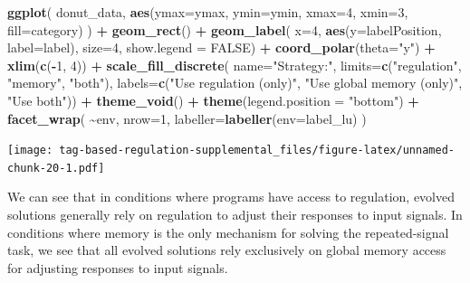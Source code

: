 \documentclass[
]{book}
\newenvironment{Shaded}{\begin{snugshade}}{\end{snugshade}}
\newcommand{\DataTypeTok}[1]{\textcolor[rgb]{0.13,0.29,0.53}{#1}}
\newcommand{\DecValTok}[1]{\textcolor[rgb]{0.00,0.00,0.81}{#1}}
\newcommand{\KeywordTok}[1]{\textcolor[rgb]{0.13,0.29,0.53}{\textbf{#1}}}
\newcommand{\NormalTok}[1]{#1}
\newcommand{\OperatorTok}[1]{\textcolor[rgb]{0.81,0.36,0.00}{\textbf{#1}}}
\newcommand{\OtherTok}[1]{\textcolor[rgb]{0.56,0.35,0.01}{#1}}
\newcommand{\StringTok}[1]{\textcolor[rgb]{0.31,0.60,0.02}{#1}}
\begin{document}
\begin{Shaded}
\begin{Highlighting}[]
\KeywordTok{ggplot}\NormalTok{( donut\_data, }\KeywordTok{aes}\NormalTok{(}\DataTypeTok{ymax=}\NormalTok{ymax, }\DataTypeTok{ymin=}\NormalTok{ymin, }\DataTypeTok{xmax=}\DecValTok{4}\NormalTok{, }\DataTypeTok{xmin=}\DecValTok{3}\NormalTok{, }\DataTypeTok{fill=}\NormalTok{category) ) }\OperatorTok{+}
\StringTok{  }\KeywordTok{geom\_rect}\NormalTok{() }\OperatorTok{+}
\StringTok{  }\KeywordTok{geom\_label}\NormalTok{( }\DataTypeTok{x=}\DecValTok{4}\NormalTok{, }\KeywordTok{aes}\NormalTok{(}\DataTypeTok{y=}\NormalTok{labelPosition, }\DataTypeTok{label=}\NormalTok{label), }\DataTypeTok{size=}\DecValTok{4}\NormalTok{, }\DataTypeTok{show.legend =} \OtherTok{FALSE}\NormalTok{) }\OperatorTok{+}
\StringTok{  }\KeywordTok{coord\_polar}\NormalTok{(}\DataTypeTok{theta=}\StringTok{"y"}\NormalTok{) }\OperatorTok{+}
\StringTok{  }\KeywordTok{xlim}\NormalTok{(}\KeywordTok{c}\NormalTok{(}\OperatorTok{{-}}\DecValTok{1}\NormalTok{, }\DecValTok{4}\NormalTok{)) }\OperatorTok{+}
\StringTok{  }\KeywordTok{scale\_fill\_discrete}\NormalTok{(}
    \DataTypeTok{name=}\StringTok{"Strategy:"}\NormalTok{,}
    \DataTypeTok{limits=}\KeywordTok{c}\NormalTok{(}\StringTok{"regulation"}\NormalTok{,}
             \StringTok{"memory"}\NormalTok{,}
             \StringTok{"both"}\NormalTok{),}
    \DataTypeTok{labels=}\KeywordTok{c}\NormalTok{(}\StringTok{"Use regulation (only)"}\NormalTok{,}
             \StringTok{"Use global memory (only)"}\NormalTok{,}
             \StringTok{"Use both"}\NormalTok{)) }\OperatorTok{+}
\StringTok{  }\KeywordTok{theme\_void}\NormalTok{() }\OperatorTok{+}
\StringTok{  }\KeywordTok{theme}\NormalTok{(}\DataTypeTok{legend.position =} \StringTok{"bottom"}\NormalTok{) }\OperatorTok{+}
\StringTok{  }\KeywordTok{facet\_wrap}\NormalTok{(}
    \OperatorTok{\textasciitilde{}}\NormalTok{env,}
    \DataTypeTok{nrow=}\DecValTok{1}\NormalTok{,}
    \DataTypeTok{labeller=}\KeywordTok{labeller}\NormalTok{(}\DataTypeTok{env=}\NormalTok{label\_lu)}
\NormalTok{  )}
\end{Highlighting}
\end{Shaded}

\texttt{[image: tag-based-regulation-supplemental\_files/figure-latex/unnamed-chunk-20-1.pdf]}

We can see that in conditions where programs have access to regulation, evolved solutions generally rely on regulation to adjust their responses to input signals.
In conditions where memory is the only mechanism for solving the repeated-signal task, we see that all evolved solutions rely exclusively on global memory access for adjusting responses to input signals.
\end{document}
